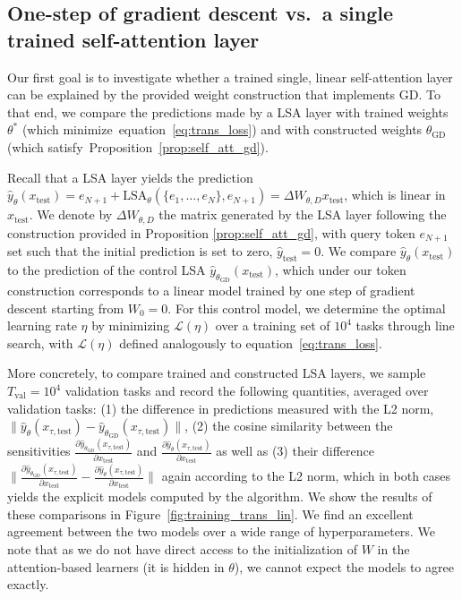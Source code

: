 \documentclass{article}
\newcommand{\lsattn}{\text{LSA}}
\def\eqref#1{equation~\ref{#1}}
\theoremstyle{plain}
\theoremstyle{definition}
\theoremstyle{remark}
\begin{document}
\subsection*{One-step of gradient descent vs.~a single trained self-attention layer}

Our first goal is to investigate whether a trained single, linear self-attention layer can be explained by the provided weight construction that implements GD. To that end, we compare the predictions made by a LSA layer with trained weights $\theta^*$ (which minimize~\eqref{eq:trans_loss}) and with constructed weights $\theta_\text{GD}$ (which satisfy~Proposition~\ref{prop:self_att_gd}).

Recall that a LSA layer yields the prediction $\hat{y}_{\theta}(x_{\text{test}}) = e_{N+1} + \lsattn_{\theta}(\{e_1,\ldots,e_N\},e_{N+1}) = \Delta W_{\theta,D} x_{\text{test}}$, which is linear in $x_{\text{test}}$. We denote by $\Delta W_{\theta,D}$ the matrix generated by the LSA layer following the construction provided in Proposition \ref{prop:self_att_gd}, with query token $e_{N+1}$ set such that the initial prediction is set to zero, $\hat{y}_{\text{test}} = 0$. We compare $\hat{y}_{\theta}(x_{\text{test}})$ to the prediction of the control LSA $\hat{y}_{\theta_\text{GD}}(x_{\text{test}})$, which under our token construction corresponds to a linear model trained by one step of gradient descent starting from $W_0=0$. For this control model, we determine the optimal learning rate $\eta$ by minimizing $\mathcal{L}(\eta)$ over a training set of $10
^4$ tasks through line search, with $\mathcal{L}(\eta)$ defined analogously to \eqref{eq:trans_loss}. 

More concretely, to compare trained and constructed LSA layers, we sample $T_\text{val}=10^4$ validation tasks and record the following quantities, averaged over validation tasks: (1) the difference in predictions measured with the L2 norm, $\|\hat{y}_\theta(x_{\tau,\text{test}}) - \hat{y}_{\theta_\text{GD}}(x_{\tau,\text{test}})\|$, (2) the cosine similarity between the sensitivities $\frac{\partial \hat{y}_{\theta_{\text{GD}}}(x_{\tau,\text{test}}) }{\partial x_{\text{test}}} $ and $ \frac{\partial \hat{y}_{\theta}(x_{\tau,\text{test}})}{\partial x_{\text{test}}}$ as well as (3) their difference $\|\frac{\partial \hat{y}_{\theta_{\text{GD}}}(x_{\tau,\text{test}}) }{\partial x_{\text{test}}} - \frac{\partial \hat{y}_{\theta}(x_{\tau,\text{test}})}{\partial x_{\text{test}}}\|$ again according to the L2 norm, which in both cases yields the explicit models computed by the algorithm. We show the results of these comparisons in Figure~\ref{fig:training_trans_lin}. We find an excellent agreement between the two models over a wide range of hyperparameters. We note that as we do not have direct access to the initialization of $W$ in the attention-based learners (it is hidden in $\theta$), we cannot expect the models to agree exactly.
\end{document}
